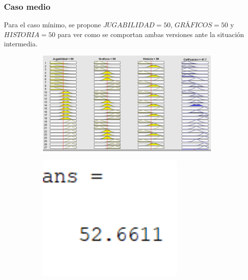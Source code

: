 \documentclass[11pt, letterpaper]{article}
\begin{document}
\newpage

\subsubsection{Caso medio}
Para el caso mínimo, se propone  $JUGABILIDAD = 50$, $GRÁFICOS = 50$ y $HISTORIA = 50$ para ver como se comportan ambas versiones ante la situación intermedia.

\begin{figure}[h]
	\centering
	\begin{subfigure}{0.40\textwidth} %
		\centering
		\includegraphics[width=1.4\textwidth]{IMG/RP12.png}
		\label{fig:G5}
	\end{subfigure}
	\hfill
	\begin{subfigure}{0.42\textwidth} %
		\centering
		\includegraphics[width=0.8\textwidth]{IMG/M12.png}
		\label{fig:G6}
	\end{subfigure}
	\label{fig:comparacion3}
\end{figure}
\end{document}
